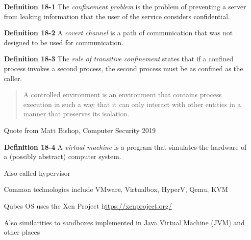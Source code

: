\documentclass[Screen16to9,17pt]{foils}
\begin{document}

\begin{list1}
\item {\bf Definition 18-1} The \emph{confinement problem} is the problem of preventing a server from leaking information that the user of the service considers confidential.
\item
\end{list1}


\begin{list1}
\item {\bf Definition 18-2} A \emph{covert channel} is a path of communication that was not designed to be used for communication.
\item
\end{list1}


\begin{list1}
\item {\bf Definition 18-3} The \emph{rule of transitive confinement} states that if a confined process invokes a second process, the second process must be as confined as the caller.
\item
\end{list1}




\begin{quote}
A controlled environment is an environment that contains process execution in such a way that it can only interact with other entities in a manner that preserves its isolation.
\end{quote}
Quote from Matt Bishop, Computer Security 2019

\begin{list1}
\item
\item
\end{list1}





\begin{list1}
\item {\bf Definition 18-4} A \emph{virtual machine} is a program that simulates the hardware of a (possibly abstract) computer system.
\item Also called hypervisor
\item Common technologies include VMware, Virtualbox, HyperV, Qemu, KVM
\item Qubes OS uses the Xen Project h\url{ttps://xenproject.org/}
\item Also similarities to sandboxes implemented in Java Virtual Machine (JVM) and other places
\end{list1}
\end{document}
